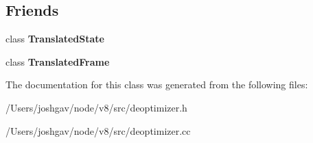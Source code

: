 \subsection*{Friends}
\begin{DoxyCompactItemize}
\item 
class {\bfseries Translated\+State}\hypertarget{classv8_1_1internal_1_1_translated_value_a93214c289745cbbfea7af56c3a474a3b}{}\label{classv8_1_1internal_1_1_translated_value_a93214c289745cbbfea7af56c3a474a3b}

\item 
class {\bfseries Translated\+Frame}\hypertarget{classv8_1_1internal_1_1_translated_value_ad4b90445e09d78ff767023f5f395b382}{}\label{classv8_1_1internal_1_1_translated_value_ad4b90445e09d78ff767023f5f395b382}

\end{DoxyCompactItemize}


The documentation for this class was generated from the following files\+:\begin{DoxyCompactItemize}
\item 
/\+Users/joshgav/node/v8/src/deoptimizer.\+h\item 
/\+Users/joshgav/node/v8/src/deoptimizer.\+cc\end{DoxyCompactItemize}
